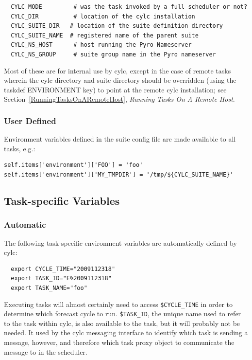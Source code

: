 \documentclass[11pt,a4paper]{article}
\begin{document}
\begin{lstlisting}
  CYLC_MODE         # was the task invoked by a full scheduler or not?
  CYLC_DIR          # location of the cylc installation
  CYLC_SUITE_DIR   # location of the suite definition directory
  CYLC_SUITE_NAME  # registered name of the parent suite 
  CYLC_NS_HOST      # host running the Pyro Nameserver
  CYLC_NS_GROUP     # suite group name in the Pyro nameserver
\end{lstlisting}

Most of these are for internal use by cylc, except in the case of remote
tasks wherein the cylc directory and suite directory should be
overridden (using the taskdef ENVIRONMENT key) to point at the remote
cylc installation; see Section~\ref{RunningTasksOnARemoteHost}, {\em
Running Tasks On A Remote Host}. 

\subsubsection{User Defined}
\label{SuiteWideVariables}

Environment variables defined in the suite config file are made
available to all tasks, e.g.: 

\lstset{language=Python}

\begin{lstlisting}
self.items['environment']['FOO'] = 'foo'
self.items['environment']['MY_TMPDIR'] = '/tmp/${CYLC_SUITE_NAME}'
\end{lstlisting}


\subsection{Task-specific Variables}
\label{TaskSpecificVariables}
\lstset{language=bash}

\subsubsection{Automatic}

The following task-specific environment variables are automatically
defined by cylc:

\begin{lstlisting}
  export CYCLE_TIME="2009112318"
  export TASK_ID="E%2009112318"
  export TASK_NAME="foo"
\end{lstlisting}

Executing tasks will almost certainly need to access
\lstinline=$CYCLE_TIME= in order to determine which forecast cycle to
run. \lstinline=$TASK_ID=, the unique name used to refer to the task
within cylc, is also available to the task, but it will probably not be
needed. It used by the cylc messaging interface to identify which task
is sending a message, however, and therefore which task proxy object to
communicate the message to in the scheduler.
\end{document}
